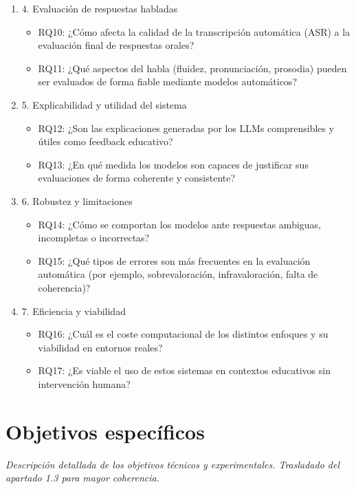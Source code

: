 {\begin{enumerate}
\begin{itemize}
    \end{itemize}
    \item 4. Evaluación de respuestas habladas
    \begin{itemize}
        \item RQ10: ¿Cómo afecta la calidad de la transcripción automática (ASR) a la evaluación final de respuestas orales?
        \item RQ11: ¿Qué aspectos del habla (fluidez, pronunciación, prosodia) pueden ser evaluados de forma fiable mediante modelos automáticos?
    \end{itemize}
    \item 5. Explicabilidad y utilidad del sistema
    \begin{itemize}
        \item RQ12: ¿Son las explicaciones generadas por los LLMs comprensibles y útiles como feedback educativo?
        \item RQ13: ¿En qué medida los modelos son capaces de justificar sus evaluaciones de forma coherente y consistente?
    \end{itemize}
    \item 6. Robustez y limitaciones
    \begin{itemize}
        \item RQ14: ¿Cómo se comportan los modelos ante respuestas ambiguas, incompletas o incorrectas?
        \item RQ15: ¿Qué tipos de errores son más frecuentes en la evaluación automática (por ejemplo, sobrevaloración, infravaloración, falta de coherencia)?
    \end{itemize}
    \item 7. Eficiencia y viabilidad
    \begin{itemize}
        \item RQ16: ¿Cuál es el coste computacional de los distintos enfoques y su viabilidad en entornos reales?
        \item RQ17: ¿Es viable el uso de estos sistemas en contextos educativos sin intervención humana?
    \end{itemize}
\end{enumerate}}


\section{Objetivos específicos}
\textit{Descripción detallada de los objetivos técnicos y experimentales. Trasladado del apartado 1.3 para mayor coherencia.}
